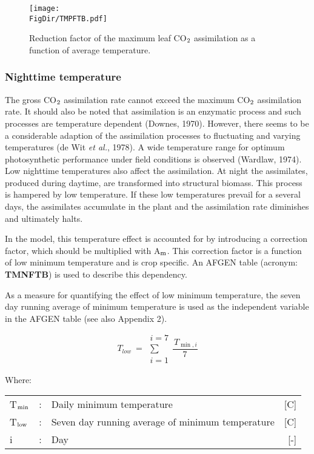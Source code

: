 \begin{figure}[p]
	\centering
	\texttt{[image: \\FigDir/TMPFTB.pdf]}
	\caption{Reduction factor of the maximum leaf CO$_{{\rm 2}}$ assimilation as a function of
		average temperature.}
	\label{fig:TMPFTB}
\end{figure}

\subsubsection{Nighttime temperature}
The gross CO$_{{\rm 2}}$ assimilation rate cannot exceed the maximum CO$_{{\rm 2}}$ assimilation rate. It
should also be noted that assimilation is an enzymatic process and such processes are
temperature dependent (Downes, 1970). However, there seems to be a considerable
adaption of the assimilation processes to fluctuating and varying temperatures (de Wit {\it et
	al.}, 1978). A wide temperature range for optimum photosynthetic performance under field
conditions is observed (Wardlaw, 1974). Low nighttime temperatures also affect the
assimilation. At night the assimilates, produced during daytime, are transformed into
structural biomass. This process is hampered by low temperature. If these low temperatures prevail 
for a several days, the assimilates accumulate in the plant and the assimilation rate diminishes 
and ultimately halts.

In the model, this temperature effect is accounted for by introducing a correction factor,
which should be multiplied with A$_{{\rm m}}$. This correction factor is a function of low minimum
temperature and is crop specific. An AFGEN table (acronym: {\bf TMNFTB}) is used to
describe this dependency.

As a measure for quantifying the effect of low minimum temperature, the seven day
running average of minimum temperature is used as the independent variable in the
AFGEN table (see also Appendix 2).

\begin{equation}
T _{low} ~=~\begin{array}{c}{i=7}  \\
\sum  \\
{i=1}\end{array}{\frac{\, T _{\min ,i} }{7}}
\end{equation}

Where:\\[5pt]
\begin{tabularx}{\textwidth}{llXr}
	T$_{{\rm min}}$  &:& Daily minimum temperature   &     [\degrees C]\\
	T$_{{\rm low}}$ &:& Seven day running average of minimum temperature    &    [\degrees C]\\
	i &:& Day    &    [-]
\end{tabularx}


